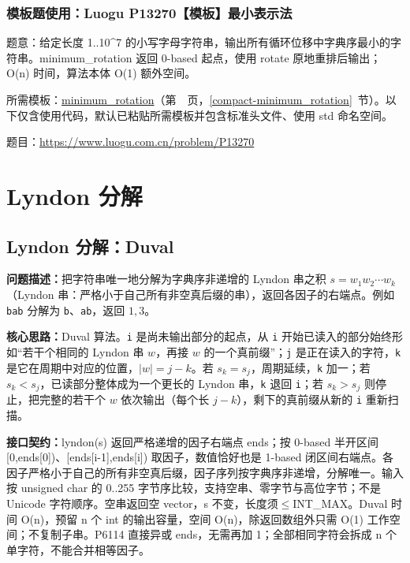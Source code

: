 

\Needspace{299pt}

\subsection*{模板题使用：Luogu P13270【模板】最小表示法}

\label{usage-example-209}

题意：给定长度 1..10\textasciicircum{}7 的小写字母字符串，输出所有循环位移中字典序最小的字符串。minimum\_rotation 返回 0-based 起点，使用 rotate 原地重排后输出；O(n) 时间，算法本体 O(1) 额外空间。

所需模板：\hyperref[compact-minimum_rotation]{minimum\_\allowbreak{}rotation}（第~\pageref{compact-minimum_rotation}~页，\ref{compact-minimum_rotation}~节）。以下仅含使用代码，默认已粘贴所需模板并包含标准头文件、使用 std 命名空间。

题目：\url{https://www.luogu.com.cn/problem/P13270}



\Needspace{570pt}

\chapter{Lyndon 分解}

\section{Lyndon 分解：Duval}\label{compact-lyndon}

\noindent\textbf{问题描述：}\allowbreak 把字符串唯一地分解为字典序非递增的 Lyndon 串之积 $s=w_1w_2\cdots w_k$（Lyndon 串：严格小于自己所有非空真后缀的串），返回各因子的右端点。例如 \texttt{bab} 分解为 \texttt{b}、\texttt{ab}，返回 $1,3$。

\textbf{核心思路：}\allowbreak Duval 算法。\texttt{i} 是尚未输出部分的起点，从 \texttt{i} 开始已读入的部分始终形如“若干个相同的 Lyndon 串 $w$，再接 $w$ 的一个真前缀”；\texttt{j} 是正在读入的字符，\texttt{k} 是它在周期中对应的位置，$|w|=j-k$。若 $s_k=s_j$，周期延续，\texttt{k} 加一；若 $s_k<s_j$，已读部分整体成为一个更长的 Lyndon 串，\texttt{k} 退回 \texttt{i}；若 $s_k>s_j$ 则停止，把完整的若干个 $w$ 依次输出（每个长 $j-k$），剩下的真前缀从新的 \texttt{i} 重新扫描。



{\sloppy{}\noindent\textbf{接口契约：}lyndon(s) 返回严格递增的因子右端点 ends；按 0-based 半开区间 [0,ends[0])、[ends[i-1],ends[i]) 取因子，数值恰好也是 1-based 闭区间右端点。各因子严格小于自己的所有非空真后缀，因子序列按字典序非递增，分解唯一。输入按 unsigned char 的 0..255 字节序比较，支持空串、零字节与高位字节；不是 Unicode 字符顺序。空串返回空 vector，s 不变，长度须$\le$INT\_MAX。Duval 时间 O(n)，预留 n 个 int 的输出容量，空间 O(n)，除返回数组外只需 O(1) 工作空间；不复制子串。P6114 直接异或 ends，无需再加 1；全部相同字符会拆成 n 个单字符，不能合并相等因子。\par}

